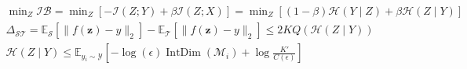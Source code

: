 ﻿\documentclass{article}
\begin{document}
\begin{preview}
\(\displaystyle
\begin{gathered}
  \min_Z \mathcal{IB}
  = \min_Z\left[-\mathcal{I}(Z;Y)+\beta\mathcal{I}(Z;X)\right]
  = \min_Z\left[(1-\beta)\mathcal{H}(Y\mid Z)+\beta\mathcal{H}(Z\mid Y)\right] \\
  \Delta_{\mathcal{S}\mathcal{T}}
  = \mathbb{E}_{\mathcal{S}}\left[\lVert f(\bm z)-y\rVert_2\right]
  - \mathbb{E}_{\mathcal{T}}\left[\lVert f(\bm z)-y\rVert_2\right]
  \leq 2KQ\left(\mathcal{H}(Z\mid Y)\right) \\
  \mathcal{H}(Z\mid Y)
  \leq \mathbb{E}_{y_i\sim\mathcal{Y}}
  \left[-\log(\epsilon)\operatorname{IntDim}(\mathcal{M}_i)
  +\log\frac{K'}{C(\epsilon)}\right]
\end{gathered}
\)
\end{preview}
\end{document}
